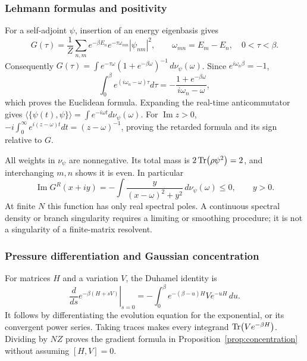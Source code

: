 \documentclass[11pt]{article}
\numberwithin{equation}{section}
\theoremstyle{exposition}
\theoremstyle{result}
\begin{document}
\subsubsection{Lehmann formulas and positivity}
For a self-adjoint $\psi$, insertion of an energy eigenbasis gives
\begin{equation*}
G(\tau)=\frac1Z\sum_{n,m}e^{-\beta E_n}e^{-\tau\omega_{mn}}|\psi_{nm}|^2,
\qquad \omega_{mn}=E_m-E_n,\quad 0<\tau<\beta.
\end{equation*}
Consequently $G(\tau)=\int e^{-\tau\omega}(1+e^{-\beta\omega})^{-1}\,d\nu_\psi(\omega)$. Since $e^{i\omega_n\beta}=-1$,
\begin{equation*}
\int_0^\beta e^{(i\omega_n-\omega)\tau}d\tau
=-\frac{1+e^{-\beta\omega}}{i\omega_n-\omega},
\end{equation*}
which proves the Euclidean formula. Expanding the real-time anticommutator gives $\langle\{\psi(t),\psi\}\rangle=\int e^{-i\omega t}d\nu_\psi(\omega)$. For $\operatorname{Im}z>0$, $-i\int_0^\infty e^{i(z-\omega)t}dt=(z-\omega)^{-1}$, proving the retarded formula and its sign relative to $G$.

All weights in $\nu_\psi$ are nonnegative. Its total mass is $2\Tr(\rho\psi^2)=2$, and interchanging $m,n$ shows it is even. In particular
\begin{equation*}
\operatorname{Im}G^R(x+iy)=-\int\frac{y}{(x-\omega)^2+y^2}\,d\nu_\psi(\omega)\leq0,
\qquad y>0.
\end{equation*}
At finite $N$ this function has only real spectral poles. A continuous spectral density or branch singularity requires a limiting or smoothing procedure; it is not a singularity of a finite-matrix resolvent.

\subsubsection{Pressure differentiation and Gaussian concentration}
For matrices $H$ and a variation $V$, the Duhamel identity is
\begin{equation*}
\left.\frac{d}{ds}e^{-\beta(H+sV)}\right|_{s=0}
=-\int_0^\beta e^{-(\beta-u)H}Ve^{-uH}\,du.
\end{equation*}
It follows by differentiating the evolution equation for the exponential, or its convergent power series. Taking traces makes every integrand $\Tr(Ve^{-\beta H})$. Dividing by $NZ$ proves the gradient formula in Proposition~\ref{prop:concentration} without assuming $[H,V]=0$.
\end{document}
